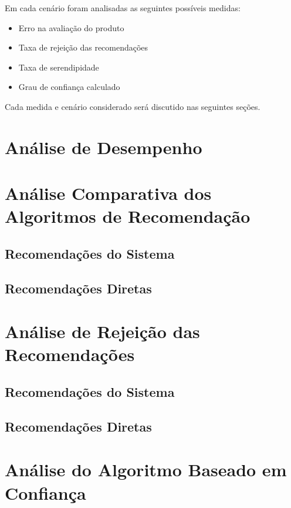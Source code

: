  Em cada cenário foram analisadas as seguintes possíveis medidas:
 
\begin{itemize}
	\item Erro na avaliação do produto
	\item Taxa de rejeição das recomendações
	\item Taxa de serendipidade
	\item Grau de confiança calculado
\end{itemize}

 Cada medida e cenário considerado será discutido nas seguintes seções.
 
\section{Análise de Desempenho}


\section{Análise Comparativa dos Algoritmos de Recomendação}

\subsection{Recomendações do Sistema}

\subsection{Recomendações Diretas}


\section{Análise de Rejeição das Recomendações}

\subsection{Recomendações do Sistema}

\subsection{Recomendações Diretas}

\section{Análise do Algoritmo Baseado em Confiança}
